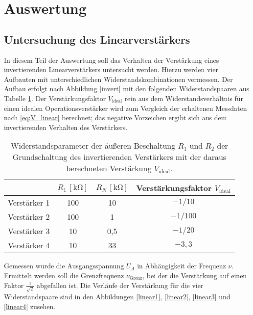 \section{Auswertung}
\subsection{Untersuchung des Linearverstärkers}
In diesem Teil der Auswertung soll das Verhalten der Verstärkung eines invertierenden Linearverstärkers untersucht werden.
Hierzu werden vier Aufbauten mit unterschiedlichen Widerstandskombinationen vermessen.
Der Aufbau erfolgt nach Abbildung \ref{invert} mit den folgenden Widerstandspaaren aus Tabelle \ref{Tab_2}.
Der Verstärkungsfaktor $V_\text{ideal}$ rein aus dem Widerstandsverhältnis für einen idealen Operationsverstärker wird zum Vergleich der erhaltenen Messdaten nach \eqref{eq:V_linear} berechnet; das negative Vorzeichen ergibt sich aus dem invertierenden Verhalten des Verstärkers.
\begin{table}[]
\centering
\begin{tabular}{c|ccc}
&$R_1\,[\si{\kilo\ohm}]$&$R_N\,[\si{\kilo\ohm}]$&Verstärkungsfaktor $V_\text{ideal}$\\
\hline
Verstärker 1 & 100 & 10  &$-1/10$\\
Verstärker 2 & 100 & 1   &$-1/100$\\
Verstärker 3 & 10  & 0,5 &$-1/20$\\
Verstärker 4 & 10  & 33  &$-3{,}3$
\end{tabular}
\caption{Widerstandsparameter der äußeren Beschaltung $R_1$ und $R_2$ der Grundschaltung des invertierenden Verstärkers mit der daraus berechneten Verstärkung $V_\text{ideal}$.}
\label{Tab_2}
\end{table}
Gemessen wurde die Ausgangsspannung $U_A$ in Abhängigkeit der Frequenz $\nu$.
Ermittelt werden soll die Grenzfrequenz $\nu_\text{Grenz}$, bei der die Verstärkung auf einen Faktor $\frac{1}{\sqrt{2}}$ abgefallen ist. Die Verläufe der Verstärkung für die vier Widerstandspaare sind in den Abbildungen \ref{linear1}, \ref{linear2}, \ref{linear3} und \ref{linear4} zusehen.

